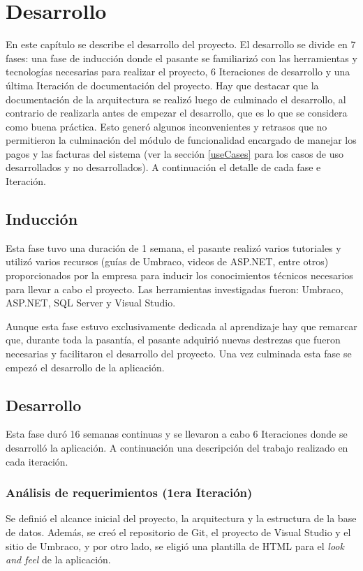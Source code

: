 \chapter{Desarrollo} \label{development}
En este capítulo se describe el desarrollo del proyecto. El desarrollo se divide en 7 fases: una fase de inducción donde el pasante se familiarizó con las herramientas y tecnologías necesarias para realizar el proyecto, 6 Iteraciones de desarrollo y una última Iteración de documentación del proyecto. Hay que destacar que la documentación de la arquitectura se realizó luego de culminado el desarrollo, al contrario de realizarla antes de empezar el desarrollo, que es lo que se considera como buena práctica. Esto generó algunos inconvenientes y retrasos que no permitieron la culminación del módulo de funcionalidad encargado de manejar los pagos y las facturas del sistema (ver la sección \ref{useCases} para los casos de uso desarrollados y no desarrollados). A continuación el detalle de cada fase e Iteración.

\section{Inducción}
Esta fase tuvo una duración de 1 semana, el pasante realizó varios tutoriales y utilizó varios recursos (guías de Umbraco, videos de ASP.NET, entre otros) proporcionados por la empresa para inducir los conocimientos técnicos necesarios para llevar a cabo el proyecto. Las herramientas investigadas fueron: Umbraco, ASP.NET, SQL Server y Visual Studio.

Aunque esta fase estuvo exclusivamente dedicada al aprendizaje hay que remarcar que, durante toda la pasantía, el pasante adquirió nuevas destrezas que fueron necesarias y facilitaron el desarrollo del proyecto. Una vez culminada esta fase se empezó el desarrollo de la aplicación.


\section{Desarrollo}
Esta fase duró 16 semanas continuas y se llevaron a cabo 6 Iteraciones donde se desarrolló la aplicación. A continuación una descripción del trabajo realizado en cada iteración.

\subsection{Análisis de requerimientos (1era Iteración)}
Se definió el alcance inicial del proyecto, la arquitectura y la estructura de la base de datos. Además, se creó el repositorio de Git, el proyecto de Visual Studio y el sitio de Umbraco, y por otro lado, se eligió una plantilla de HTML para el \emph{look and feel} de la aplicación.

